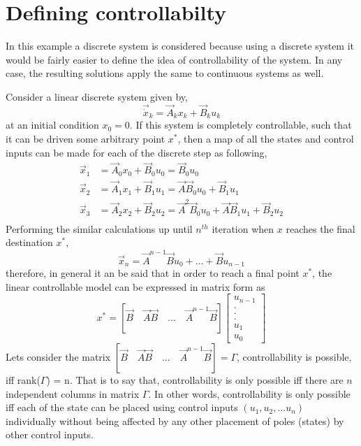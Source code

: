 \section{Defining controllabilty} \label{Sec_2_ch_25_Controllabiliry}

In this example a discrete system is considered because using a discrete system it would be fairly easier to define the idea of controllability of the system. In any case, the resulting solutions apply the same to continuous systems as well. 

Consider a linear discrete system given by,
\begin{equation}
	\vec{\dot{x}}_{k} = \vec{{A}}_{k} {x}_{k} + \vec{{B}}_{k} {u}_{k}
\end{equation}
at an initial condition $x_0 = 0$. If this system is completely controllable, such that it can be driven some arbitrary point $x^{*}$, then a map of all the states and control inputs can be made for each of the discrete step as following,
\begin{align*}
	\vec{{x}}_{1} &= \vec{{A}}_{0} {x}_{0} + \vec{{B}}_{0} {u}_{0} = \vec{{B}}_{0} {u}_{0} \\
	\vec{{x}}_{2} &= \vec{{A}}_{1} {x}_{1} + \vec{{B}}_{1} {u}_{1} = \vec{{A}} \vec{{B}}_{0} {u}_{0} + \vec{{B}}_{1} {u}_{1} \\
	\vec{{x}}_{3} &= \vec{{A}}_{2} {x}_{2} + \vec{{B}}_{2} {u}_{2} = \vec{{A}}^{2} \vec{{B}}_{0} {u}_{0} + \vec{{A}} \vec{{B}}_{1} {u}_{1} + \vec{{B}}_{2} {u}_{2} \\
\end{align*}
Performing the similar calculations up until $n^{th}$ iteration when $x$ reaches the final destination $x^{*}$,
\begin{equation}
	\vec{{x}}_{n} = \vec{A}^{n - 1} \vec{B}u_{0} + ... + \vec{B}u_{n - 1}
\end{equation}
therefore, in general it an be said that in order to reach a final point $x^{*}$, the linear controllable model can be expressed in matrix form as
\begin{equation}
	x^{*} = [\vec{B} \quad \vec{A}\vec{B} \quad ... \quad \vec{A}^{n - 1} \vec{B}]\begin{bmatrix}
		u_{n - 1} \\ . \\. \\. \\ u_{1} \\ u_{0}
	\end{bmatrix}
\end{equation}
Lets consider the matrix $[\vec{B} \quad \vec{A}\vec{B} \quad ... \quad \vec{A}^{n - 1} \vec{B}] = \Gamma$, controllability is possible, iff rank($\Gamma$) = n. That is to say that, controllability is only possible iff there are $n$ independent columns in matrix $\Gamma$. In other words, controllability is only possible iff each of the state can be placed using control inputs $(u_1, u_2, ... u_n)$ individually without being affected by any other placement of poles (states) by other control inputs.

